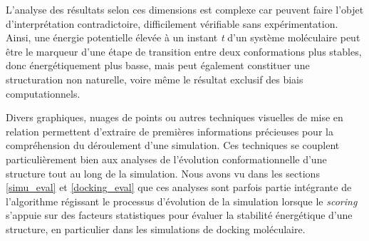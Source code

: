 




L'analyse des résultats selon ces dimensions est complexe car  peuvent faire l'objet d'interprétation contradictoire, difficilement vérifiable sans expérimentation. Ainsi, une énergie potentielle élevée à un instant \textit{t} d'un système moléculaire peut être le marqueur d'une étape de transition entre deux conformations plus stables, donc énergétiquement plus basse, mais peut également constituer une structuration non naturelle, voire même le résultat exclusif des biais computationnels. %



Divers graphiques, nuages de points ou autres techniques visuelles de mise en relation permettent d'extraire de premières informations précieuses pour la compréhension du déroulement d'une simulation. Ces techniques se couplent particulièrement bien aux analyses de l'évolution conformationnelle d'une structure tout au long de la simulation. Nous avons vu dans les sections \ref{simu_eval} et \ref{docking_eval} que ces analyses sont parfois partie intégrante de l'algorithme régissant le processus d'évolution de la simulation lorsque le \textit{scoring} s'appuie sur des facteurs statistiques pour évaluer la stabilité énergétique d'une structure, en particulier dans les simulations de docking moléculaire.


